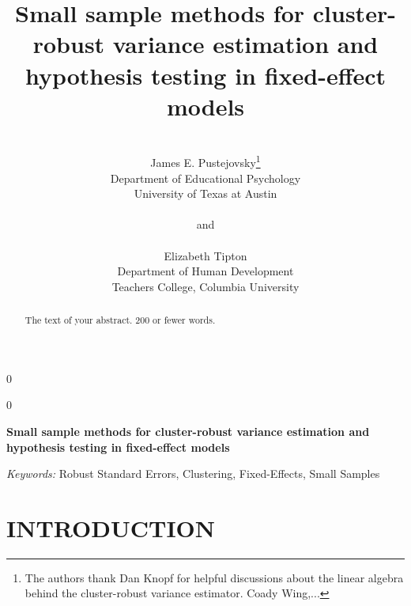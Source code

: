 \documentclass[12pt]{article}
\newcommand{\blind}{0}
\begin{document}


\def\spacingset#1{\renewcommand{\baselinestretch}%
{#1}\small\normalsize} \spacingset{1}



\blind
{
  \title{\bf Small sample methods for cluster-robust variance estimation and hypothesis testing in fixed-effect models}
  \author{\\James E. Pustejovsky\thanks{
    The authors thank Dan Knopf for helpful discussions about the linear algebra behind the cluster-robust variance estimator. Coady Wing,...}\hspace{.2cm}\\
    Department of Educational Psychology \\ 
    University of Texas at Austin\\ \\
    and \\ \\
    Elizabeth Tipton \\
    Department of Human Development \\ 
    Teachers College, Columbia University}
  \maketitle
} \fi

\blind
{
  \bigskip
  \bigskip
  \bigskip
  \begin{center}
    {\LARGE\bf Small sample methods for cluster-robust variance estimation and hypothesis testing in fixed-effect models}
\end{center}
  \medskip
} \fi

\bigskip
\begin{abstract}
The text of your abstract.  200 or fewer words.
\end{abstract}

\noindent%
{\it Keywords:} Robust Standard Errors, Clustering, Fixed-Effects, Small Samples
\vfill

\newpage
\spacingset{1.45} %

\section{INTRODUCTION}
\label{sec:intro}
\end{document}
